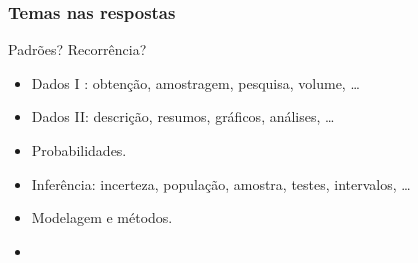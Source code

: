 \documentclass[handout,serif, professionalfont, usenames, dvipsnames, aspectratio = 169]{beamer}\usepackage[]{graphicx}\usepackage[]{color}
\begin{document}
\begin{frame}
  \frametitle{Temas nas respostas}

  Padrões? Recorrência?
  
  \pause
  
  \begin{itemize}
    \itemsep 2ex
  \item Dados I : obtenção, amostragem, pesquisa, volume, \ldots 
  \item Dados II: descrição, resumos, gráficos, análises, \ldots
  \item Probabilidades.
  \item Inferência: incerteza, população, amostra, testes, intervalos, \ldots
  \item Modelagem e métodos.
  \item {}
  \end{itemize}
  
\end{frame}
\end{document}
